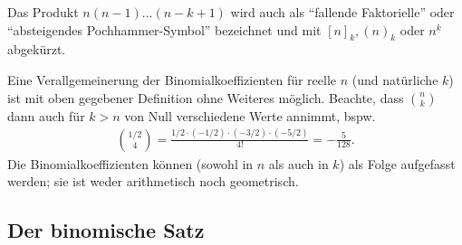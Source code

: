 Das Produkt $n(n-1)\hdots(n-k+1)$ wird auch als ``fallende Faktorielle'' oder ``absteigendes Pochhammer-Symbol'' bezeichnet und mit $[n]_k, (n)_k$ oder $n^{\underline{k}}$ abgekürzt.

Eine Verallgemeinerung der Binomialkoeffizienten für reelle $n$ (und natürliche $k$) ist mit oben gegebener Definition ohne Weiteres möglich. Beachte, dass $\binom{n}{k}$ dann auch für $k>n$ von Null verschiedene Werte annimmt, bspw. 
\begin{align}
    \binom{1/2}{4} = \frac{1/2\cdot (-1/2)\cdot (-3/2) \cdot (-5/2)}{4!} = -\frac{5}{128}. 
\end{align}
Die Binomialkoeffizienten können (sowohl in $n$ als auch in $k$) als Folge aufgefasst werden; sie ist weder arithmetisch noch geometrisch. 

\subsection{Der binomische Satz}

